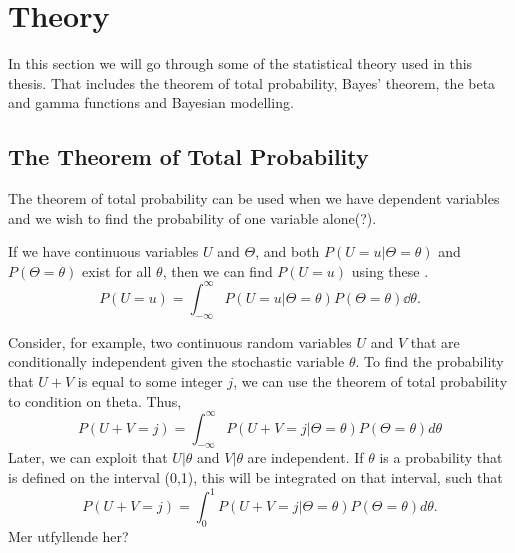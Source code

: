 \newpage
\section{Theory}
In this section we will go through some of the statistical theory used in this thesis. That includes the theorem of total probability, Bayes' theorem, the beta and gamma functions and Bayesian modelling. 

\subsection{The Theorem of Total Probability}
The theorem of total probability can be used when we have dependent variables and we wish to find the probability of one variable alone(?).
\begin{theorem}
If we have continuous variables $U$ and $\Theta$, and both $P(U=u|\Theta=\theta)$ and  $P(\Theta=\theta)$ exist for all $\theta$, then we can find $P(U=u)$ using these \citep{schay2016introduction}. 
\begin{equation}
    \label{lawoftotprob}
    P(U=u) = \int_{-\infty}^{\infty} P(U=u|\Theta=\theta)P(\Theta=\theta) \dd \theta.
\end{equation}
\end{theorem}

\begin{comment}
In \citet{schay2016introduction}, the theorem of total probability for continuous variables is stated as 
\begin{theorem}[Theorem of Total Probability, Continuous Versions]
 For a continuous random variable Y and any event A, if $f_{Y|A}$ and $f_Y$ exists for all y, then
\begin{equation}
    P(A) = \int_{-\infty}^{\infty}
    P(A|Y=y)f_Y(y) dy.
\end{equation}
\end{theorem}
\end{comment}




Consider, for example, two continuous random variables $U$ and $V$ that are conditionally independent given the stochastic variable $\theta$. To find the probability that $U+V$ is equal to some integer $j$, we can use the theorem of total probability to condition on theta. Thus,
\begin{equation*}
    P(U+V=j) = \int_{-\infty}^\infty P(U+V=j|\Theta=\theta)P(\Theta=\theta) d\theta
\end{equation*}
Later, we can exploit that $U|\theta$ and $V|\theta$ are independent. If $\theta$ is a probability that is defined on the interval (0,1), this will be integrated on that interval, such that 
\begin{equation*}
    P(U+V=j) = \int_{0}^1 P(U+V=j|\Theta=\theta)P(\Theta=\theta) d\theta.
\end{equation*}
Mer utfyllende her?




